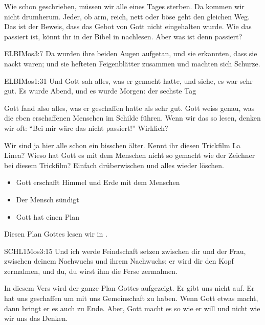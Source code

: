 
        Wie schon geschrieben, müssen wir alle eines Tages sterben. Da kommen wir nicht drumherum. Jeder, ob arm, reich, nett oder böse geht den gleichen Weg.  Das ist der Beweis, dass das Gebot von Gott nicht eingehalten wurde. Wie das passiert ist, könnt ihr in der Bibel in  nachlesen. Aber was ist denn passiert?
        \begin{bibelquote}{ELB}{IMos}{3:7}
            Da wurden ihre beiden Augen aufgetan, und sie erkannten, dass sie nackt waren; und sie hefteten Feigenblätter zusammen und machten sich Schurze.
        \end{bibelquote}
             
        \begin{bibelquote}{ELB}{IMos}{1:31}
             Und Gott sah alles, was er gemacht hatte, und siehe, es war sehr gut. Es wurde Abend, und es wurde Morgen: der sechste Tag
        \end{bibelquote}
        Gott fand also alles, was er geschaffen hatte als sehr gut. Gott weiss genau, was die eben erschaffenen Menschen im Schilde führen. Wenn wir das so lesen, denken wir oft: \enquote{Bei mir wäre das nicht passiert!} Wirklich?

        Wir sind ja hier alle schon ein bisschen älter. Kennt ihr diesen Trickfilm La Linea? Wieso hat Gott es mit dem Menschen nicht so gemacht wie der Zeichner bei diesem Trickfilm? Einfach drüberwischen und alles wieder löschen.
        \begin{itemize}
            \item Gott erschafft Himmel und Erde mit dem Menschen
            \item Der Mensch sündigt
            \item Gott hat einen Plan
        \end{itemize}
        
        Diesen Plan Gottes lesen wir in . 
        \begin{bibelquote}{SCHL}{1Mos}{3:15}
            Und ich werde Feindschaft setzen zwischen dir und der Frau, zwischen deinem Nachwuchs und ihrem Nachwuchs; er wird dir den Kopf zermalmen, und du, du wirst ihm die Ferse zermalmen.
        \end{bibelquote}
        In diesem Vers wird der ganze Plan Gottes aufgezeigt. Er gibt uns nicht auf. Er hat uns geschaffen um mit uns Gemeinschaft zu haben. Wenn Gott etwas macht, dann bringt er es auch zu Ende. Aber, Gott macht es so wie er will und nicht wie wir uns das Denken.

